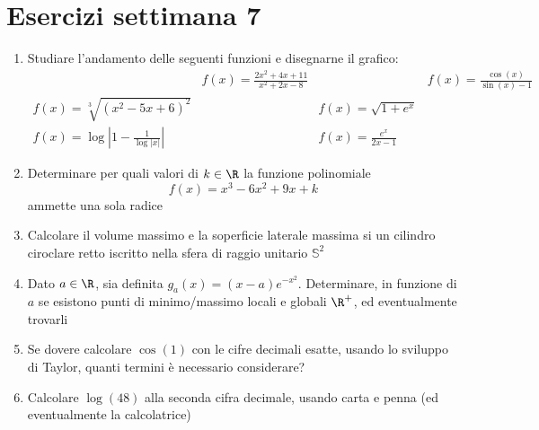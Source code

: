\section{Esercizi settimana 7}
\begin{enumerate}
	\item  Studiare l'andamento delle seguenti funzioni e disegnarne il grafico:
	      \begin{align*}
		                                                                            & f\left(x\right) = \frac{2x^2  + 4x + 11}{x^2  + 2x - 8} &                                       & f\left(x\right) = \frac{\cos \left(x\right)}{ \sin \left(x\right) -1} \\
		      f\left(x\right) = \sqrt[3]{\left(x^2 - 5x + 6\right)^2 }              &                                                         & f\left(x\right) = \sqrt{1 + e^{x}}                                                                            \\
		      f\left(x\right) = \log \left|1 - \frac{1}{\log \left|x\right|}\right| &                                                         & f\left(x\right) = \frac{e^{x}}{2x -1}
	      \end{align*}
	\item Determinare per quali valori di $ k \in  \R  $ la funzione polinomiale
	      \[
		      f\left(x\right) = x^3  - 6x^2  + 9x + k
	      \]
	      ammette una sola radice
	\item Calcolare il volume massimo e la soperficie laterale massima si un cilindro ciroclare retto iscritto nella sfera di raggio unitario $ \mathbb{S}^2  $
	\item Dato $ a \in  \R  $, sia definita $ g_a \left(x\right) = \left(x-a\right)e ^{-x^2 } $. Determinare, in funzione di $ a $ se esistono punti di minimo/massimo locali e globali $ \R ^{+} $, ed eventualmente trovarli
	\item Se dovere calcolare $ \cos \left(1\right) $ con le cifre decimali esatte, usando lo sviluppo di Taylor, quanti termini è necessario considerare?
	\item Calcolare $ \log \left(48\right) $ alla seconda cifra decimale, usando carta e penna (ed eventualmente la calcolatrice)
\end{enumerate}
